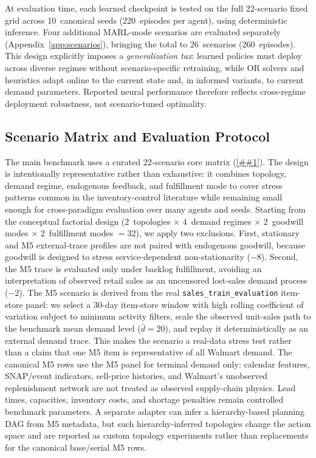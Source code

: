 \documentclass[10pt,a4paper]{article}
\providecommand{\Cref}[1]{\ref{##1}}
\begin{document}
At evaluation time, each learned checkpoint is tested on the full
22-scenario fixed grid across 10~canonical seeds (220~episodes per
agent), using deterministic inference. Four additional MARL-mode
scenarios are evaluated separately (Appendix~\ref{app:scenarios}),
bringing the total to 26~scenarios (260~episodes). This design
explicitly imposes a \emph{generalization tax}: learned policies must
deploy across diverse regimes without scenario-specific retraining,
while OR solvers and heuristics adapt online to the current state and,
in informed variants, to current demand parameters. Reported neural
performance therefore reflects cross-regime deployment robustness, not
scenario-tuned optimality.

\subsection{Scenario Matrix and Evaluation Protocol}

The main benchmark uses a curated 22-scenario core matrix
(\Cref{tab:scenario_axes}). The design is intentionally representative
rather than exhaustive: it combines topology, demand regime, endogenous
feedback, and fulfillment mode to cover stress patterns common in the
inventory-control literature while remaining small enough for
cross-paradigm evaluation over many agents and seeds. Starting from the
conceptual factorial design
($2$~topologies $\times$ $4$~demand regimes $\times$ $2$~goodwill modes
$\times$ $2$~fulfillment modes $=32$), we apply two exclusions. First,
stationary and M5 external-trace profiles are not paired with endogenous
goodwill, because goodwill is designed to stress service-dependent
non-stationarity ($-8$). Second, the M5 trace is evaluated only under
backlog fulfillment, avoiding an interpretation of observed retail
sales as an uncensored lost-sales demand process ($-2$).
The M5 scenario is derived from the real \texttt{sales\_train\_evaluation}
item-store panel: we select a 30-day item-store window with high rolling
coefficient of variation subject to minimum activity filters, scale the
observed unit-sales path to the benchmark mean demand level
($\bar d=20$), and replay it deterministically as an external demand
trace. This makes the scenario a real-data stress test rather than a
claim that one M5 item is representative of all Walmart demand. The
canonical M5 rows use the M5 panel for terminal demand only: calendar
features, SNAP/event indicators, sell-price histories, and Walmart's
unobserved replenishment network are not treated as observed supply-chain
physics. Lead times, capacities, inventory costs, and shortage penalties
remain controlled benchmark parameters. A separate adapter can infer a
hierarchy-based planning DAG from M5 metadata, but such hierarchy-inferred
topologies change the action space and are reported as custom topology
experiments rather than replacements for the canonical base/serial M5 rows.
\end{document}
